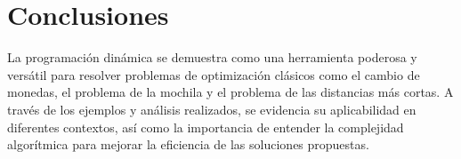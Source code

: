 \section{Conclusiones}
La programación dinámica se demuestra como una herramienta poderosa y versátil para resolver problemas de optimización clásicos como el cambio de monedas, el problema de la mochila y el problema de las distancias más cortas. A través de los ejemplos y análisis realizados, se evidencia su aplicabilidad en diferentes contextos, así como la importancia de entender la complejidad algorítmica para mejorar la eficiencia de las soluciones propuestas.
